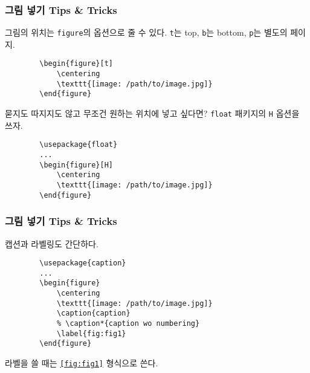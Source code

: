 \begin{frame}[fragile]
    \frametitle{그림 넣기 Tips \& Tricks}

    그림의 위치는 \texttt{figure}의 옵션으로 줄 수 있다. \texttt{t}는 top, \texttt{b}는 bottom, \texttt{p}는 별도의 페이지.
    \begin{verbatim}
        \begin{figure}[t]
            \centering
            \texttt{[image: /path/to/image.jpg]}
        \end{figure}
    \end{verbatim}

    묻지도 따지지도 않고 무조건 원하는 위치에 넣고 싶다면? \texttt{float} 패키지의 \texttt{H} 옵션을 쓰자.
    \begin{verbatim}
        \usepackage{float}
        ...
        \begin{figure}[H]
            \centering
            \texttt{[image: /path/to/image.jpg]}
        \end{figure}
    \end{verbatim}

\end{frame}

\begin{frame}[fragile]
    \frametitle{그림 넣기 Tips \& Tricks}

    캡션과 라벨링도 간단하다.
    \begin{verbatim}
        \usepackage{caption}
        ...
        \begin{figure}
            \centering
            \texttt{[image: /path/to/image.jpg]}
            \caption{caption}
            % \caption*{caption wo numbering}
            \label{fig:fig1}
        \end{figure}
    \end{verbatim}
    라벨을 쓸 때는 \texttt{\ref{fig:fig1}} 형식으로 쓴다.

\end{frame}


